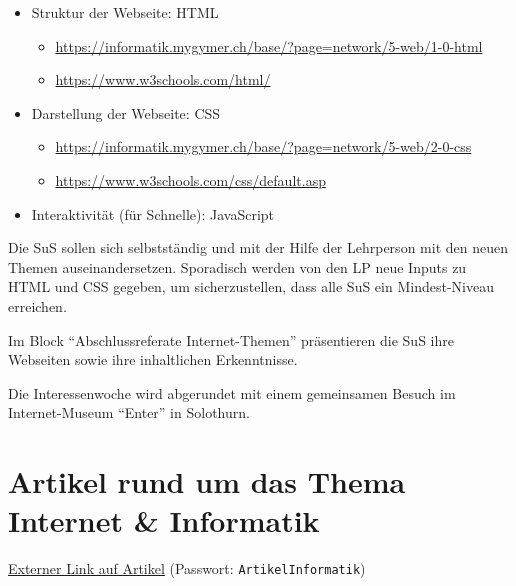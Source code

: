 \begin{itemize}
	\item Struktur der Webseite: HTML
	      \begin{itemize}
		      \item \url{https://informatik.mygymer.ch/base/?page=network/5-web/1-0-html}
		      \item \url{https://www.w3schools.com/html/}
	      \end{itemize}
	\item Darstellung der Webseite: CSS
	      \begin{itemize}
		      \item \url{https://informatik.mygymer.ch/base/?page=network/5-web/2-0-css}
		      \item \url{https://www.w3schools.com/css/default.asp}
	      \end{itemize}
	\item Interaktivität (für Schnelle): JavaScript
\end{itemize}

Die SuS sollen sich selbstständig und mit der Hilfe der Lehrperson mit den neuen Themen auseinandersetzen. Sporadisch werden von den LP neue Inputs zu HTML und CSS gegeben, um sicherzustellen, dass alle SuS ein Mindest-Niveau erreichen.

Im Block \enquote{Abschlussreferate Internet-Themen} präsentieren die SuS ihre Webseiten sowie ihre inhaltlichen Erkenntnisse.

Die Interessenwoche wird abgerundet mit einem gemeinsamen Besuch im Internet-Museum \enquote{Enter} in Solothurn.

\section{Artikel rund um das Thema Internet \& Informatik}

\href{https://cvb.synology.me:5001/d/s/xflXoKAdPcwsUA7UOIPYdo5mTBH1Fbed/-WXHCLktNMkJ3LkzV_FPl3swz1tTFKgx-4LFAJedcbws}{\faLink{} Externer Link auf Artikel} (Passwort: \texttt{ArtikelInformatik})
